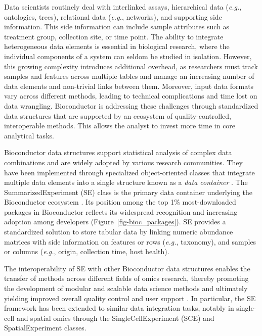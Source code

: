 \documentclass[
  sn-nature,
]{sn-jnl}
\begin{document}
Data scientists routinely deal with interlinked assays, hierarchical
data (\emph{e.g.}, ontologies, trees), relational data (\emph{e.g.},
networks), and supporting side information. This side information can
include sample attributes such as treatment group, collection site, or
time point. The ability to integrate heterogeneous data elements is
essential in biological research, where the individual components of a
system can seldom be studied in isolation. However, this growing
complexity introduces additional overhead, as researchers must track
samples and features across multiple tables and manage an increasing
number of data elements and non-trivial links between them. Moreover,
input data formats vary across different methods, leading to technical
complications and time lost on data wrangling. Bioconductor is
addressing these challenges through standardized data structures that
are supported by an ecosystem of quality-controlled, interoperable
methods. This allows the analyst to invest more time in core analytical
tasks.

Bioconductor data structures support statistical analysis of complex
data combinations \citep{huber2015} and are widely adopted by various
research communities. They have been implemented through specialized
object-oriented classes that integrate multiple data elements into a
single structure known as a \emph{data container} \citep{chambers2014}.
The SummarizedExperiment (SE) class is the primary data container
underlying the Bioconductor ecosystem \citep{huber2015, morgan2025}. Its
position among the top 1\% most-downloaded packages in Bioconductor
reflects its widespread recognition and increasing adoption among
developers (Figure~\ref{fig-bioc_packages}). SE provides a standardized
solution to store tabular data by linking numeric abundance matrices
with side information on features or rows (\emph{e.g.}, taxonomy), and
samples or columns (\emph{e.g.}, origin, collection time, host health).

The interoperability of SE with other Bioconductor data structures
enables the transfer of methods across different fields of omics
research, thereby promoting the development of modular and scalable data
science methods and ultimately yielding improved overall quality control
and user support \citep{drnevich2025}. In particular, the SE framework
has been extended to similar data integration tasks, notably in
single-cell and spatial omics through the SingleCellExperiment (SCE)
\citep{amezquita2020} and SpatialExperiment \citep{crowell2025} classes.
\end{document}
